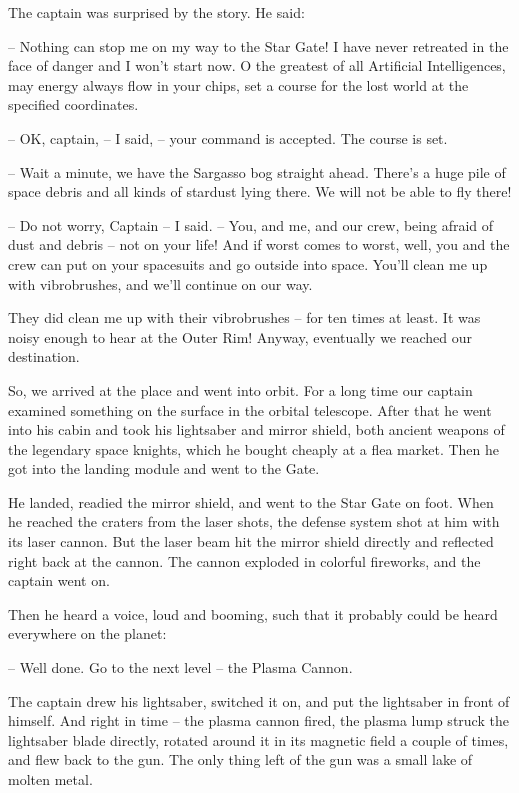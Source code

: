 \documentclass[ebook,twoside,final,openright]{memoir}
\begin{document}
\par
The captain was surprised by the story. He said:\par
– Nothing can stop me on my way to the Star Gate! I have never retreated in the face of danger and I won’t start now. O the greatest of all Artificial Intelligences, may energy always flow in your chips, set a course for the lost world at the specified coordinates.\par
– OK, captain, – I said, – your command is accepted. The course is set.\par
– Wait a minute, we have the Sargasso bog straight ahead. There's a huge pile of space debris and all kinds of stardust lying there. We will not be able to fly there!\par
– Do not worry, Captain – I said. – You, and me, and our crew, being afraid of dust and debris – not on your life! And if worst comes to worst, well, you and the crew can put on your spacesuits and go outside into space. You’ll clean me up with vibrobrushes, and we’ll continue on our way.\par
\par
They did clean me up with their vibrobrushes – for ten times at least. It was noisy enough to hear at the Outer Rim! Anyway, eventually we reached our destination.\par
\par
So, we arrived at the place and went into orbit. For a long time our captain examined something on the surface in the orbital telescope. After that he went into his cabin and took his lightsaber and mirror shield, both ancient weapons of the legendary space knights, which he bought cheaply at a flea market. Then he got into the landing module and went to the Gate.\par
\par
He landed, readied the mirror shield, and went to the Star Gate on foot. When he reached the craters from the laser shots, the defense system shot at him with its laser cannon. But the laser beam hit the mirror shield directly and reflected right back at the cannon. The cannon exploded in colorful fireworks, and the captain went on.\par
\par
Then he heard a voice, loud and booming, such that it probably could be heard everywhere on the planet:\par
– Well done. Go to the next level – the Plasma Cannon.\par
The captain drew his lightsaber, switched it on, and put the lightsaber in front of himself. And right in time – the plasma cannon fired, the plasma lump struck the lightsaber blade directly, rotated around it in its magnetic field a couple of times, and flew back to the gun. The only thing left of the gun was a small lake of molten metal.\par
\end{document}
